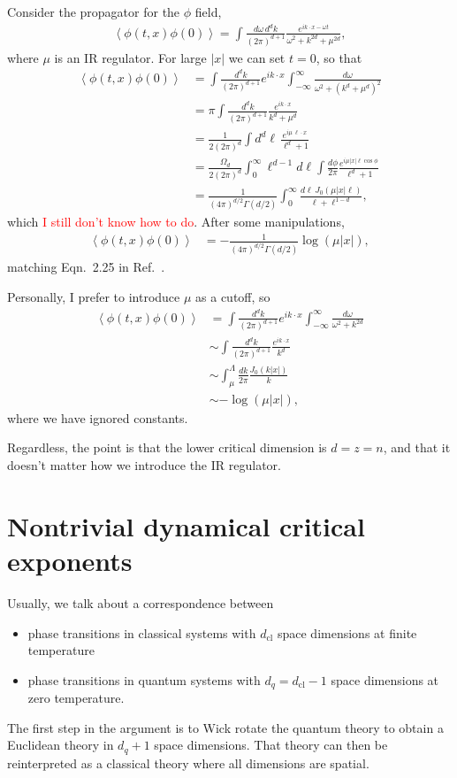 \documentclass[12pt]{article}
\newcommand{\note}[1]{\textcolor{red}{#1}}
\newcommand{\ex}[1]{\left\langle#1\right\rangle}
\newcommand{\nn}{\nonumber\\}
\renewcommand{\th}[1]{\frac{1}{#1}}
\renewcommand{\l}{\ell}
\newcommand{\cl}{\text{cl}}
\begin{document}
Consider the propagator for the $\phi$ field,
\begin{align}
\ex{\phi(t,x) \phi(0)} = \int\frac{d\omega\, d^dk}{(2 \pi)^{d + 1}} \frac{e^{ik\cdot x -\omega t}}{\omega^2 + k^{2d} + \mu^{2d}},
\end{align}
where $\mu$ is an IR regulator. For large $|x|$ we can set $t=0$, so that
\begin{align}
\ex{\phi(t,x) \phi(0)} &= \int \frac{d^dk}{(2 \pi)^{d + 1}}e^{ik\cdot x} \int_{-\infty}^{\infty} \frac{d \omega}{\omega^2 + (k^d + \mu^d)^2}\nn
&= \pi \int \frac{d^dk}{(2 \pi)^{d + 1}} \frac{e^{ik\cdot x}}{k^{d}+\mu^{d}}\nn
&= \th{2(2\pi)^d}\int d^d\l\, \frac{e^{i\mu\,\l\cdot x}}{\l^d + 1}\nn
&= \frac{\Omega_d}{2(2\pi)^d}\int_0^\infty \l^{d-1} d\l \int \frac{d\phi}{2\pi}\frac{e^{i\mu|x|\l\cos \phi}}{\l^d+1}\nn
&= \th{(4\pi)^{d/2}\Gamma(d/2)}\int_0^\infty \frac{d \l\, J_0( \mu|x|\l)}{\l+ \l^{1-d}},
\end{align}
which \note{I still don't know how to do}. After some manipulations,
\begin{align}
\ex{\phi(t,x) \phi(0)} &= -\th{(4\pi)^{d/2} \Gamma(d/2)}\log(\mu|x|),
\end{align}
matching Eqn.~2.25 in Ref.~\cite{Griffin2015}.

Personally, I prefer to introduce $\mu$ as a cutoff, so
\begin{align}
\ex{\phi(t,x) \phi(0)} &= \int \frac{d^dk}{(2 \pi)^{d + 1}}e^{ik\cdot x} \int_{-\infty}^{\infty} \frac{d \omega}{\omega^2 + k^{2d}}\nn
&\sim \int \frac{d^dk}{(2 \pi)^{d + 1}} \frac{e^{ik\cdot x}}{k^d}\nn
&\sim \int_\mu^\Lambda \frac{dk}{2\pi} \frac{J_0(k |x|)}{k}\nn
&\sim -\log(\mu|x|),
\end{align}
where we have ignored constants.

Regardless, the point is that the lower critical dimension is $d=z=n$, and that it doesn't matter how we introduce the IR regulator.


\section{Nontrivial dynamical critical exponents}

Usually, we talk about a correspondence between \begin{itemize}
    \item phase transitions in classical systems with $d_\cl$ space dimensions at finite temperature
    \item phase transitions in quantum systems with $d_q=d_\cl-1$ space dimensions at zero temperature.
\end{itemize}
The first step in the argument is to Wick rotate the quantum theory to obtain a Euclidean theory in $d_q+1$ space dimensions. That theory can then be reinterpreted as a classical theory where all dimensions are spatial.
\end{document}
